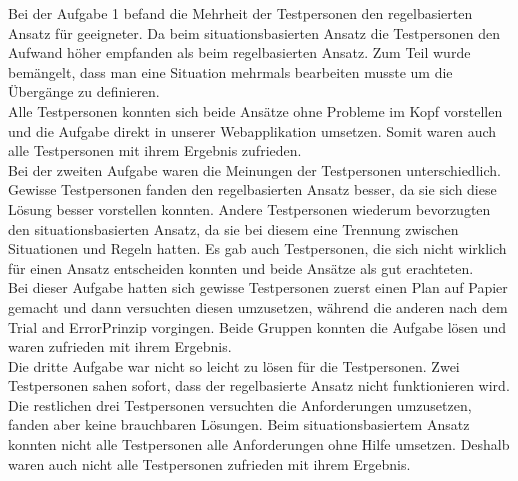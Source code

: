 \begin{figure}[ht]
\qquad
%
\begin{minipage}[b][7cm][s]{.45\textwidth}
\centering
{}
%
\end{minipage}
\end{figure}
%
%
Bei der Aufgabe 1 befand die Mehrheit der Testpersonen den regelbasierten Ansatz für geeigneter. Da beim situationsbasierten Ansatz die Testpersonen den Aufwand höher empfanden als beim regelbasierten Ansatz. Zum Teil wurde bemängelt, dass man eine Situation mehrmals bearbeiten musste um die Übergänge zu definieren.\\
Alle Testpersonen konnten sich beide Ansätze ohne Probleme im Kopf vorstellen und die Aufgabe direkt in unserer Webapplikation umsetzen. Somit waren auch alle Testpersonen mit ihrem Ergebnis zufrieden.\\[2ex]
%
Bei der zweiten Aufgabe waren die Meinungen der Testpersonen unterschiedlich. Gewisse Testpersonen fanden den regelbasierten Ansatz besser, da sie sich diese Lösung besser vorstellen konnten. Andere Testpersonen wiederum bevorzugten den situationsbasierten Ansatz, da sie bei diesem eine Trennung zwischen Situationen und Regeln hatten.
Es gab auch Testpersonen, die sich nicht wirklich für einen Ansatz entscheiden konnten und beide Ansätze als gut erachteten.\\
Bei dieser Aufgabe hatten sich gewisse Testpersonen zuerst einen Plan auf Papier gemacht und dann versuchten diesen umzusetzen, während die anderen nach dem \glqq Trial and Error\grqq Prinzip vorgingen. Beide Gruppen konnten die Aufgabe lösen und waren zufrieden mit ihrem Ergebnis.\\[2ex]
%
Die dritte Aufgabe war nicht so leicht zu lösen für die Testpersonen. Zwei Testpersonen sahen sofort, dass der regelbasierte Ansatz nicht funktionieren wird. Die restlichen drei Testpersonen versuchten die Anforderungen umzusetzen, fanden aber keine brauchbaren Lösungen. Beim situationsbasiertem Ansatz konnten nicht alle Testpersonen alle Anforderungen ohne Hilfe umsetzen. Deshalb waren auch nicht alle Testpersonen zufrieden mit ihrem Ergebnis.\\
